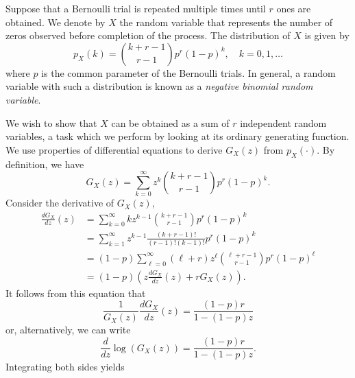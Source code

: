 \begin{example}
Suppose that a Bernoulli trial is repeated multiple times until $r$ ones are obtained.
We denote by $X$ the random variable that represents the number of zeros observed before completion of the process.
The distribution of $X$ is given by
\begin{equation*}
p_X (k) = \binom{k+r-1}{r-1} p^r (1-p)^k, \quad k = 0, 1, \ldots
\end{equation*}
where $p$ is the common parameter of the Bernoulli trials.
In general, a random variable with such a distribution is known as a \emph{negative binomial random variable}. 

We wish to show that $X$ can be obtained as a sum of $r$ independent random variables, a task which we perform by looking at its ordinary generating function.
We use properties of differential equations to derive $G_X(z)$ from $p_X(\cdot)$.
By definition, we have
\begin{equation*}
G_X (z) = \sum_{k = 0}^{\infty} z^k \binom{k+r-1}{r-1} p^r (1-p)^k .
\end{equation*}
Consider the derivative of $G_X(z)$,
\begin{equation*}
\begin{split}
\frac{d G_X}{dz} (z)
&= \sum_{k=0}^{\infty} k z^{k-1} \binom{k+r-1}{r-1} p^r (1-p)^k \\
&= \sum_{k=1}^{\infty} z^{k-1} \frac{(k+r-1)!}{(r-1)!(k-1)!} p^r (1-p)^k \\
&= (1-p) \sum_{\ell=0}^{\infty} (\ell+r) z^{\ell} \binom{\ell+r-1}{r-1} p^r (1-p)^{\ell} \\
&= (1-p) \left( z \frac{d G_X}{dz} (z) + r G_X(z) \right) .
\end{split}
\end{equation*}
It follows from this equation that
\begin{equation*}
\frac{1}{G_X(z)} \frac{d G_X}{dz}(z) = \frac{(1-p) r}{1 - (1-p) z}
\end{equation*}
or, alternatively, we can write
\begin{equation*}
\frac{d}{dz} \log \left( G_X(z) \right) = \frac{(1-p) r}{1 - (1-p) z} .
\end{equation*}
Integrating both sides yields 

\end{example}
